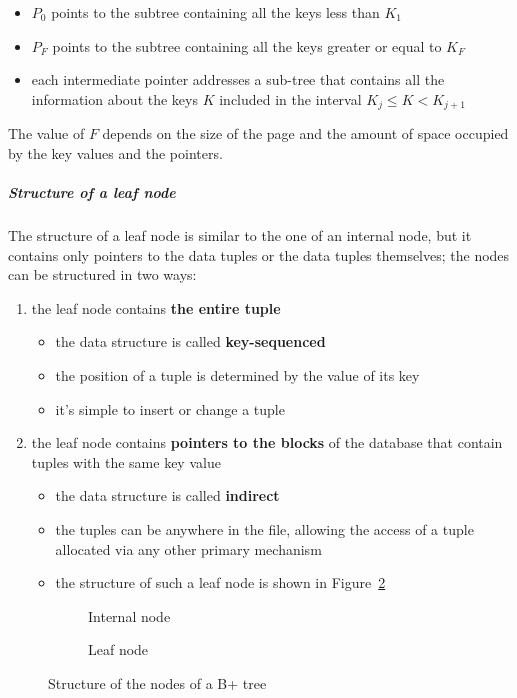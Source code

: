 \documentclass[english]{article}
\begin{document}
\begin{itemize}
  \item \(P_0\) points to the subtree containing all the keys less than \(K_1\)
  \item \(P_F\) points to the subtree containing all the keys greater or equal to \(K_F\)
  \item each intermediate pointer addresses a sub-tree that contains all the information about the keys \(K\) included in the interval \(K_j \leq K < K_{j + 1}\)
\end{itemize}

The value of \(F\) depends on the size of the page and the amount of space occupied by the key values and the pointers.

\subparagraph*{Structure of a leaf node}
The structure of a leaf node is similar to the one of an internal node, but it contains only pointers to the data tuples or the data tuples themselves;
the nodes can be structured in two ways:

\begin{enumerate}
  \item the leaf node contains \textbf{the entire tuple}
        \begin{itemize}
          \item the data structure is called \textbf{key-sequenced}
          \item the position of a tuple is determined by the value of its key
          \item it's simple to insert or change a tuple
        \end{itemize}
  \item the leaf node contains \textbf{pointers to the blocks} of the database that contain tuples with the same key value
        \begin{itemize}
          \item the data structure is called \textbf{indirect}
          \item the tuples can be anywhere in the file, allowing the access of a tuple allocated via any other primary mechanism
          \item the structure of such a leaf node is shown in Figure~\ref{subfig:b-tree-leaf-node}
        \end{itemize}
\end{enumerate}

\begin{figure}[htbp]
  \centering
  \bigskip
  \begin{subfigure}{0.99\textwidth}
    \centering
    \bigskip
    \caption{Internal node}
    \label{subfig:b-tree-internal-node}
    \bigskip
  \end{subfigure}
  \bigskip
  \begin{subfigure}{0.99\textwidth}
    \centering
    \bigskip
    \caption{Leaf node}
    \label{subfig:b-tree-leaf-node}
    \bigskip
  \end{subfigure}
  \caption{Structure of the nodes of a B+ tree}
  \label{fig:b-tree-structure}
\end{figure}
\end{document}
